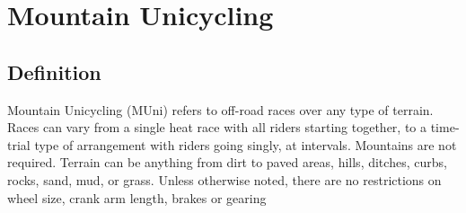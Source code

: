 \chapter{Mountain Unicycling}

\section{Definition}
Mountain Unicycling (MUni) refers to off-road races over any type of terrain. Races can vary from a single heat race 
with all riders starting together, to a time-trial type of arrangement with riders going singly, at intervals. Mountains are not 
required. Terrain can be anything from dirt to paved areas, hills, ditches, curbs, rocks, sand, mud, or grass. Unless 
otherwise noted, there are no restrictions on wheel size, crank arm length, brakes or gearing
